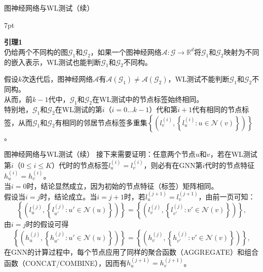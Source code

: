 \documentclass{beamer}
\newenvironment{formal}{%
	\def\FrameCommand{%
		\hspace{1pt}%
		{\color{deepgreen}\vrule width 2pt}%
		{\color{greenshade}\vrule width 4pt}%
		\colorbox{greenshade}%
	}%
	\MakeFramed{\advance\hsize-\width\FrameRestore}%
	\noindent\hspace{-4.55pt}%
	\begin{adjustwidth}{}{7pt}%
		\vspace{2pt}\vspace{2pt}%
	}
	{%
		\vspace{2pt}
	\end{adjustwidth}\endMakeFramed%
}
\begin{document}
\begin{frame}{图神经网络与WL测试（续）~\cite{xu2019gin}}
	\begin{formal}
		\textbf{引理1}\\
		仍给两个不同构的图$\mathscr{G}_1$和$\mathscr{G}_2$，如果一个图神经网络$\mathcal{A}:\mathscr{G}\to\mathbb{R}^d$将$\mathscr{G}_1$和$\mathscr{G}_2$映射为{\color{red}不同的嵌入表示}，WL测试也能判断$\mathscr{G}_1$和$\mathscr{G}_2${\color{red}不同构}。
	\end{formal}
	{\color{red}假设$k$次迭代后，图神经网络$\mathcal{A}$有$\mathcal{A}\left(\mathscr{G}_1\right)\neq\mathcal{A}\left(\mathscr{G}_2\right)$，WL测试不能判断$\mathscr{G}_1$和$\mathscr{G}_2$不同构}。\\
	从而，前$k-1$代中，$\mathscr{G}_1$和$\mathscr{G}_2$在WL测试中的节点标签始终相同。\\
	特别地，$\mathscr{G}_1$和$\mathscr{G}_2$在WL测试的第$i$（$i=0\dots k-1$）代和第$i+1$代有相同的节点标签，从而$\mathscr{G}_1$和$\mathscr{G}_2$有相同的邻居节点标签多重集$\left\{\left(l_v^{\left(i\right)},\left\{l_u^{\left(i\right)}:u\in\mathcal{N}\left(v\right)\right\}\right)\right\}$。
\end{frame}

\begin{frame}{图神经网络与WL测试（续）}
	接下来需要证明：{\color{red}任意两个节点$u$和$v$，若在WL测试第$i$（$0\le i\le K$）代时的节点标签$l_u^{\left(i\right)}=l_v^{\left(i\right)}$，则必有在GNN第$i$代时的节点特征$h_u^{\left(i\right)}=h_v^{\left(i\right)}$}。\\
	当$i=0$时，结论显然成立，因为初始的节点特征（标签）矩阵相同。\\
	假设当$i=j$时，结论成立。当$i=j+1$时，若$l_u^{\left(j+1\right)}=l_v^{\left(j+1\right)}$，由前一页可知：
	\begin{equation}
		\left\{\left(l_u^{\left(j\right)},\left\{l_{u'}^{\left(j\right)}:u'\in\mathcal{N}\left(u\right)\right\}\right)\right\}=\left\{\left(l_v^{\left(j\right)},\left\{l_{v'}^{\left(j\right)}:v'\in\mathcal{N}\left(v\right)\right\}\right)\right\},
	\end{equation}
	由$i=j$时的假设可得
	\begin{equation}
		\left\{\left(h_u^{\left(j\right)},\left\{h_{u'}^{\left(j\right)}:u'\in\mathcal{N}\left(u\right)\right\}\right)\right\}=\left\{\left(h_v^{\left(j\right)},\left\{h_{v'}^{\left(j\right)}:v'\in\mathcal{N}\left(v\right)\right\}\right)\right\},
	\end{equation}
	在GNN的计算过程中，每个节点应用了同样的聚合函数（AGGREGATE）和组合函数（CONCAT/COMBINE），因而有$h_u^{\left(j+1\right)}=h_v^{\left(j+1\right)}$。
\end{frame}
\end{document}
